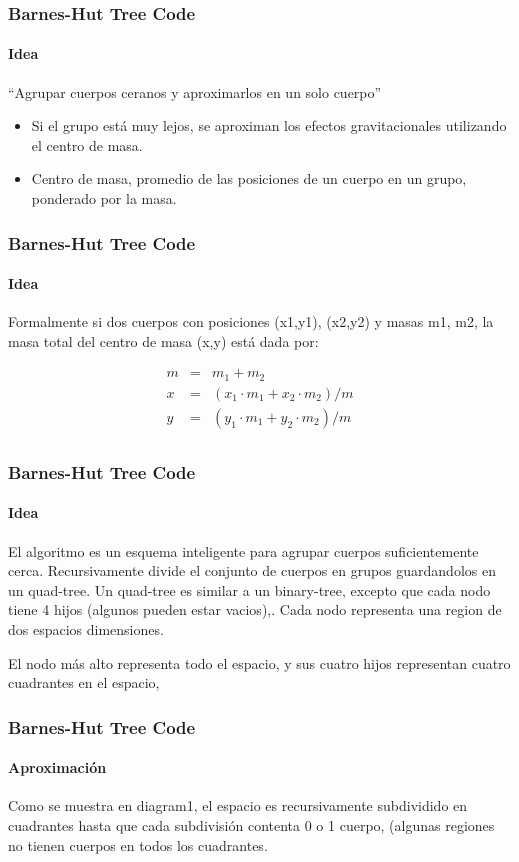 \frame
{
\frametitle{Barnes-Hut Tree Code}
\framesubtitle{Idea}

\begin{center}
``Agrupar cuerpos ceranos y aproximarlos en un solo cuerpo''
\end{center}

\begin{itemize}
	\item Si el grupo está muy lejos, se aproximan los efectos gravitacionales
		 utilizando el centro de masa.
	\item Centro de masa, promedio de las posiciones de un cuerpo en un grupo,
		 ponderado por la masa.
\end{itemize}
}

\frame
{
\frametitle{Barnes-Hut Tree Code}
\framesubtitle{Idea}



Formalmente si dos cuerpos con posiciones (x1,y1), (x2,y2) y masas m1, m2,
la masa total del centro de masa (x,y) está dada por:

\begin{eqnarray}
	m &=& m_{1} + m_{2} \nonumber \\
	x &=& (x_{1}\cdot m_{1} + x_{2}\cdot m_{2}) / m \nonumber \\
	y &=& (y_{1}\cdot m_{1} + y_{2}\cdot m_{2}) / m \nonumber \\
\end{eqnarray}

}

\frame
{
\frametitle{Barnes-Hut Tree Code}
\framesubtitle{Idea}

El algoritmo es un esquema inteligente para agrupar cuerpos
suficientemente cerca.
Recursivamente divide el conjunto de cuerpos en grupos
guardandolos en un quad-tree.
Un quad-tree es similar a un binary-tree, excepto que cada nodo
tiene 4 hijos (algunos pueden estar vacios),.
Cada nodo representa una region de dos espacios dimensiones.

El nodo más alto representa todo el espacio,
y sus cuatro hijos representan cuatro cuadrantes en el espacio,
}

\frame
{
\frametitle{Barnes-Hut Tree Code}
\framesubtitle{Aproximación}

Como se muestra en  diagram1, el espacio es recursivamente
subdividido en cuadrantes
hasta que cada subdivisión contenta 0 o 1 cuerpo,
(algunas regiones no tienen cuerpos en todos los cuadrantes.

}


